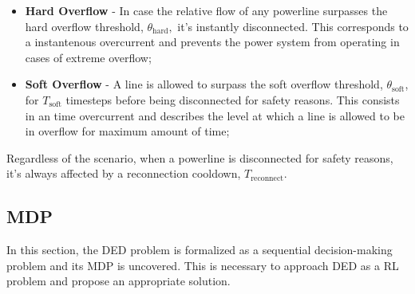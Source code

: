 \begin{itemize}
	\item \textbf{Hard Overflow} - In case the relative flow of any powerline surpasses the hard overflow threshold, $\theta_\text{hard},$ it's instantly disconnected. This corresponds to a instantenous overcurrent and prevents the power system from operating in cases of extreme overflow;
	\item \textbf{Soft Overflow} - A line is allowed to surpass the soft overflow threshold, $\theta_\text{soft}$, for $T_\text{soft}$ timesteps before being disconnected for safety reasons. This consists in an time overcurrent and describes the level at which a line is allowed to be in overflow for maximum amount of time;
\end{itemize}
Regardless of the scenario, when a powerline is disconnected for safety reasons, it's always affected by a reconnection cooldown, $T_\text{reconnect}$.

\subsection{\acf{MDP}}

In this section, the \ac{DED} problem is formalized as a sequential decision-making problem and its \ac{MDP} is uncovered. This is necessary to approach \ac{DED} as a \ac{RL} problem and propose an appropriate solution. 

